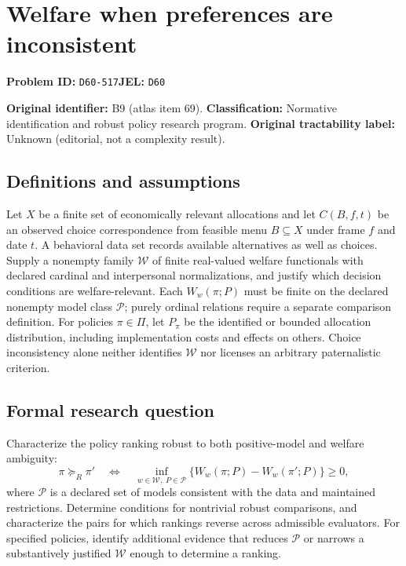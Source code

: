 \documentclass[11pt,a4paper]{article}
\begin{document}
\section*{Welfare when preferences are inconsistent}
\textbf{Problem ID:} \texttt{D60-517}\quad \textbf{JEL:} \texttt{D60}\par
\label{problem:OP-0069}
\label{atlas:prob:B9}

\noindent\textbf{Original identifier:} B9 (atlas item 69). \textbf{Classification:} Normative identification and robust policy research program. \textbf{Original tractability label:} Unknown (editorial, not a complexity result).

\subsection*{Definitions and assumptions}

Let $X$ be a finite set of economically relevant allocations and let $C(B,f,t)$ be an observed choice correspondence from feasible menu $B\subseteq X$ under frame $f$ and date $t$. A behavioral data set records available alternatives as well as choices. Supply a nonempty family $\mathcal W$ of finite real-valued welfare functionals with declared cardinal and interpersonal normalizations, and justify which decision conditions are welfare-relevant. Each $W_w(\pi;P)$ must be finite on the declared nonempty model class $\mathcal P$; purely ordinal relations require a separate comparison definition. For policies $\pi\in\Pi$, let $P_\pi$ be the identified or bounded allocation distribution, including implementation costs and effects on others. Choice inconsistency alone neither identifies $\mathcal W$ nor licenses an arbitrary paternalistic criterion.

\subsection*{Formal research question}

Characterize the policy ranking robust to both positive-model and welfare ambiguity:
\[
\pi\succeq_R\pi'\quad\Longleftrightarrow\quad
\inf_{w\in\mathcal W,\;P\in\mathcal P}\{W_w(\pi;P)-W_w(\pi';P)\}\geq0,
\]
where $\mathcal P$ is a declared set of models consistent with the data and maintained restrictions. Determine conditions for nontrivial robust comparisons, and characterize the pairs for which rankings reverse across admissible evaluators. For specified policies, identify additional evidence that reduces $\mathcal P$ or narrows a substantively justified $\mathcal W$ enough to determine a ranking.
\end{document}
